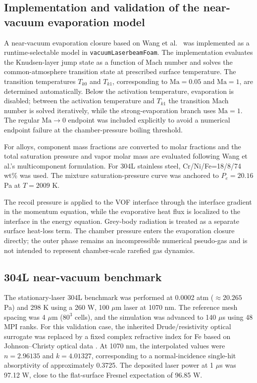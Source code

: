 \subsection{Implementation and validation of the near-vacuum evaporation model}

A near-vacuum evaporation closure based on Wang et al.~\cite{Wang2020}
was implemented as a runtime-selectable model in \texttt{vacuumLaserbeamFoam}.
The implementation evaluates the Knudsen-layer jump state as a function of
Mach number and solves the common-atmosphere transition state at prescribed
surface temperature. The transition temperatures $T_{k0}$ and $T_{k1}$,
corresponding to $\mathrm{Ma}=0.05$ and $\mathrm{Ma}=1$, are determined
automatically. Below the activation temperature, evaporation is disabled;
between the activation temperature and $T_{k1}$ the transition Mach number is
solved iteratively, while the strong-evaporation branch uses $\mathrm{Ma}=1$.
The regular $\mathrm{Ma}\rightarrow0$ endpoint was included explicitly to
avoid a numerical endpoint failure at the chamber-pressure boiling threshold.

For alloys, component mass fractions are converted to molar fractions and the
total saturation pressure and vapor molar mass are evaluated following Wang
et al.'s multicomponent formulation. For 304L stainless steel,
Cr/Ni/Fe=18/8/74 wt\% was used. The mixture saturation-pressure curve was
anchored to $P_e=20.16$ Pa at $T=2009$ K.

The recoil pressure is applied to the VOF interface through the interface
gradient in the momentum equation, while the evaporative heat flux is
localized to the interface in the energy equation. Grey-body radiation is
treated as a separate surface heat-loss term. The chamber pressure enters the
evaporation closure directly; the outer phase remains an incompressible
numerical pseudo-gas and is not intended to represent chamber-scale rarefied
gas dynamics.

\subsection{304L near-vacuum benchmark}

The stationary-laser 304L benchmark was performed at 0.0002 atm
($\approx20.265$ Pa) and 298 K using a 260 W, 100 $\mu$m laser at 1070 nm.
The reference mesh spacing was 4 $\mu$m ($80^3$ cells), and the simulation was
advanced to 140 $\mu$s using 48 MPI ranks. For this validation case, the
inherited Drude/resistivity optical surrogate was replaced by a fixed complex
refractive index for Fe based on Johnson--Christy optical data
\cite{JohnsonChristy1974}. At 1070 nm, the interpolated values were
$n=2.96135$ and $k=4.01327$, corresponding to a normal-incidence single-hit
absorptivity of approximately 0.3725. The deposited laser power at 1 $\mu$s
was 97.12 W, close to the flat-surface Fresnel expectation of 96.85 W.

